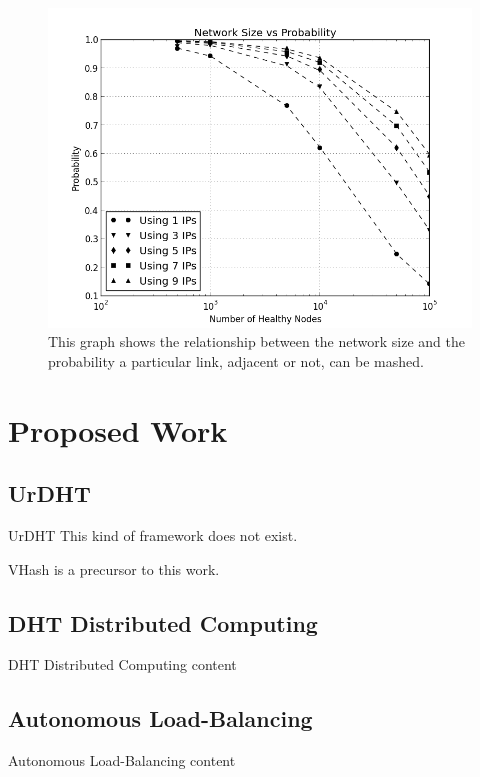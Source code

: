 \documentclass[11pt]{beamer}
\begin{document}
\begin{frame}
    \begin{figure}
        \centering
        \includegraphics[width=0.7\linewidth]{figs/size_occlusion_chord}
        \caption{This graph shows the relationship between the network size and the probability a particular link, adjacent or not, can be mashed.}
        \label{fig:exp3}
    \end{figure}
\end{frame}
    

\section{Proposed Work}



\subsection{UrDHT}
\begin{frame}{UrDHT}
	This kind of framework does not exist.
	
	VHash is a precursor to this work.
\end{frame}



\subsection{DHT Distributed Computing}
\begin{frame}{DHT Distributed Computing}
	content
\end{frame}



\subsection{Autonomous Load-Balancing}
\begin{frame}{Autonomous Load-Balancing}
	content
\end{frame}




\end{document}
